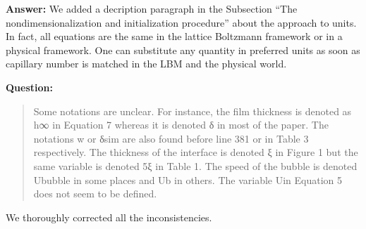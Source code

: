 \documentclass{article}
\begin{document}
\textbf{Answer:} We added a decription paragraph in the Subsection ``The nondimensionalization and
initialization procedure'' about the approach to units. In fact, all equations are the same in the
lattice Boltzmann framework or in a physical framework. One can substitute any quantity in
preferred units as soon as capillary number is matched in the LBM and the physical world. 

\textbf{Question:}
\begin{quotation}
Some notations are unclear. For instance, the ﬁlm thickness is denoted as h∞ in Equation 7 whereas
it is denoted δ in most of the paper. The notations w or δsim are also found before line 381 or in
Table 3 respectively. The thickness of the interface is denoted ξ in Figure 1 but the same variable
is
denoted 5ξ in Table 1. The speed of the bubble is denoted Ububble in some places and Ub in others.
The variable Uin Equation 5 does not seem to be deﬁned.
\end{quotation}

 We thoroughly corrected all the inconsistencies.




\end{document}
